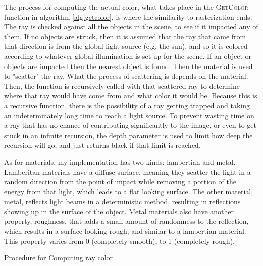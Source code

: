\documentclass{IEEEtran}
\begin{document}
The process for computing the actual color, what takes place in the \textsc{GetColor} function in
algorithm \ref{alg:getcolor}, is where the similarity to rasterization ends. The ray is checked
against all the objects in the scene, to see if it impacted any of them. If no objects are struck,
then it is assumed that the ray that came from that direction is from the global light source (e.g.
the sun), and so it is colored according to whatever global illumination is set up for the scene. If
an object or objects are impacted then the nearest object is found. Then the material is used to
"scatter" the ray. What the process of scattering is depends on the material. Then, the function is
recursively called with that scattered ray to determine where that ray would have come from and what
color it would be. Because this is a recursive function, there is the possibility of a ray getting
trapped and taking an indeterminately long time to reach a light source. To prevent wasting time on
a ray that has no chance of contributing significantly to the image, or even to get stuck in an
infinite recursion, the depth parameter is used to limit how deep the recursion will go, and just
returns black if that limit is reached.

As for materials, my implementation has two kinds: lambertian and metal. Lamberitan materials have a
diffuse surface, meaning they scatter the light in a random direction from the point of impact while
removing a portion of the energy from that light, which leads to a flat looking surface. The other
material, metal, reflects light beams in a deterministic method, resulting in reflections showing up
in the surface of the object. Metal materials also have another property, roughness, that adds a
small amount of randomness to the reflection, which results in a surface looking rough, and similar
to a lambertian material. This property varies from 0 (completely smooth), to 1 (completely rough).

\begin{algorithm}[b]
    \caption{Procedure for Computing ray color}\label{alg:getcolor}
\end{algorithm}
\end{document}
